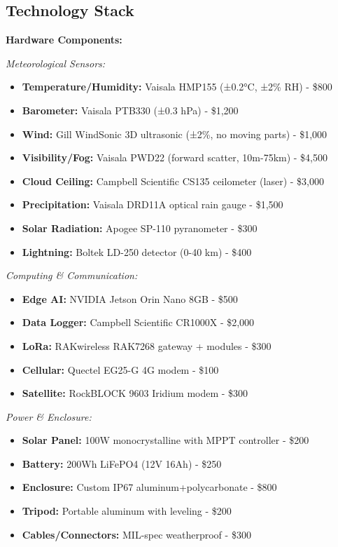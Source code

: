 \subsection{Technology Stack}

\textbf{Hardware Components:}

\textit{Meteorological Sensors:}
\begin{itemize}
    \item \textbf{Temperature/Humidity:} Vaisala HMP155 (±0.2°C, ±2\% RH) - \$800
    \item \textbf{Barometer:} Vaisala PTB330 (±0.3 hPa) - \$1,200
    \item \textbf{Wind:} Gill WindSonic 3D ultrasonic (±2\%, no moving parts) - \$1,000
    \item \textbf{Visibility/Fog:} Vaisala PWD22 (forward scatter, 10m-75km) - \$4,500
    \item \textbf{Cloud Ceiling:} Campbell Scientific CS135 ceilometer (laser) - \$3,000
    \item \textbf{Precipitation:} Vaisala DRD11A optical rain gauge - \$1,500
    \item \textbf{Solar Radiation:} Apogee SP-110 pyranometer - \$300
    \item \textbf{Lightning:} Boltek LD-250 detector (0-40 km) - \$400
\end{itemize}

\textit{Computing \& Communication:}
\begin{itemize}
    \item \textbf{Edge AI:} NVIDIA Jetson Orin Nano 8GB - \$500
    \item \textbf{Data Logger:} Campbell Scientific CR1000X - \$2,000
    \item \textbf{LoRa:} RAKwireless RAK7268 gateway + modules - \$300
    \item \textbf{Cellular:} Quectel EG25-G 4G modem - \$100
    \item \textbf{Satellite:} RockBLOCK 9603 Iridium modem - \$300
\end{itemize}

\textit{Power \& Enclosure:}
\begin{itemize}
    \item \textbf{Solar Panel:} 100W monocrystalline with MPPT controller - \$200
    \item \textbf{Battery:} 200Wh LiFePO4 (12V 16Ah) - \$250
    \item \textbf{Enclosure:} Custom IP67 aluminum+polycarbonate - \$800
    \item \textbf{Tripod:} Portable aluminum with leveling - \$200
    \item \textbf{Cables/Connectors:} MIL-spec weatherproof - \$300
\end{itemize}

